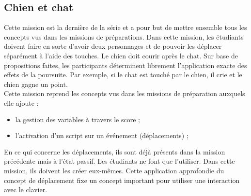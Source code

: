\subsection{Chien et chat}
\label{chien-chat}
Cette mission est la dernière de la série et a pour but de mettre ensemble tous les concepts vus dans les missions de préparations. Dans cette mission, les étudiants doivent faire en sorte d'avoir deux personnages et de pouvoir les déplacer séparément à l'aide des touches. Le chien doit courir après le chat. Sur base de propositions faites, les participants déterminent librement l'application exacte des effets de la poursuite. Par exemple, si le chat est touché par le chien, il crie et le chien gagne un point.\\

Cette mission reprend les concepts vus dans les missions de préparation auxquels elle ajoute :
\begin{itemize}
\item la gestion des variables à travers le score ;
\item l'activation d'un script sur un événement (déplacements) ;
\end{itemize}

En ce qui concerne les déplacements, ils sont déjà présents dans la mission précédente mais à l'état passif. Les étudiants ne font que l'utiliser. Dans cette mission, ils doivent les créer eux-mêmes. Cette application approfondie du concept de déplacement fixe un concept important pour utiliser une interaction avec le clavier.

